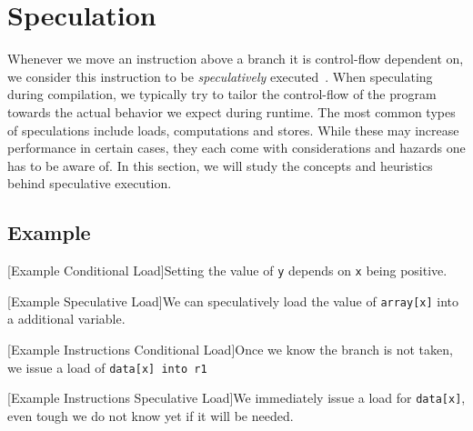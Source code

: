 \section{Speculation}
\label{sec:speculation}
Whenever we move an instruction above a branch it is control-flow dependent on, we consider this instruction to be \textit{speculatively} executed~\cite{chang95}. When speculating during compilation, we typically try to tailor the control-flow of the program towards the actual behavior we expect during runtime. The most common types of speculations include loads, computations and stores. While these may increase performance in certain cases, they each come with considerations and hazards one has to be aware of. In this section, we will study the concepts and heuristics behind speculative execution. 


\subsection{Example}
\begin{center}
    \begin{minipage}{.45\textwidth}
        \centering
        
        \captionsetup{type=listing}
        [Example Conditional Load]{Setting the value of \texttt{y} depends on \texttt{x} being positive.}
    \end{minipage}\hfill
    \begin{minipage}{.45\textwidth}
        \centering
        
        \captionsetup{type=listing}
        [Example Speculative Load]{We can speculatively load the value of \texttt{array[x]} into a additional variable.}
    \end{minipage}
\end{center}

\begin{center}
    \begin{minipage}{.45\textwidth}
        \centering
        
        \captionsetup{type=listing}
        [Example Instructions Conditional Load]{Once we know the branch is not taken, we issue a load of \texttt{data[x] into \texttt{r1}}}
    \end{minipage}\hfill
    \begin{minipage}{.45\textwidth}
        \centering
         
        \captionsetup{type=listing}
        [Example Instructions Speculative Load]{We immediately issue a load for \texttt{data[x]}, even tough we do not know yet if it will be needed.}
    \end{minipage}
\end{center}

